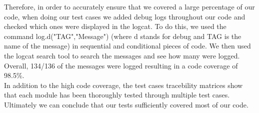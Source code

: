 \documentclass[12pt, titlepage]{article}
\begin{document}
Therefore, in order to accurately ensure that we covered a large percentage of our code, when doing our test cases we added debug logs throughout our code and checked which ones were displayed in the logcat. To do this, we used the command log.d("TAG","Message") (where d stands for debug and TAG is the name of the message) in sequential and conditional pieces of code. We then used the logcat search tool to search the messages and see how many were logged. Overall, 134/136 of the messages were logged resulting in a code coverage of 98.5\%.\\

In addition to the high code coverage, the test cases tracebility matrices show that each module has been thoroughly tested through multiple test cases. Ultimately we can conclude that our tests sufficiently covered most of our code.





\end{document}
